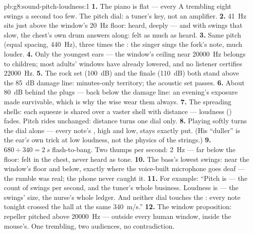 \begin{solution}{pb:g8:sound-pitch-loudness:1}
\textbf{1.} The piano is flat --- every A trembling eight
swings a second too few. The pitch dial: a tuner's key, not
an amplifier.
\textbf{2.} \qty{41}{Hz} sits just above the window's
\qty{20}{Hz} floor: heard, deeply --- and with swings that
slow, the chest's own drum answers along: felt as much as
heard.
\textbf{3.} Same pitch (equal spacing, \qty{440}{Hz}),
three times the : the singer sings the fork's note,
much louder.
\textbf{4.} Only the youngest ears --- the window's ceiling
near \qty{20000}{Hz} belongs to children; most adults'
windows have already lowered, and no listener certifies
\qty{22000}{Hz}.
\textbf{5.} The rock set (\qty{100}{dB}) and the finale
(\qty{110}{dB}) both stand above the \qty{85}{dB} damage
line: minutes-only territory; the acoustic set passes.
\textbf{6.} About \qty{80}{dB} behind the plugs --- back
below the damage line: an evening's exposure made
survivable, which is why the wise wear them always.
\textbf{7.} The spreading shells: each squeeze is shared
over a vaster shell with distance --- loudness ()
fades. Pitch rides unchanged: distance turns one dial only.
\textbf{8.} Playing softly turns the  dial alone
--- every note's , high and low, stays exactly
put. (His ``duller'' is the ear's own trick at low
loudness, not the physics of the strings.)
\textbf{9.} $680 \div 340 = \qty{2}{s}$ flash-to-bang. Two
thumps per second: \qty{2}{Hz} --- far below the floor:
felt in the chest, never heard as tone.
\textbf{10.} The bass's lowest swings: near the window's
floor and below, exactly where the voice-built microphone
goes deaf --- the rumble was real; the phone never caught
it.
\textbf{11.} For example: ``Pitch is  --- the count
of swings per second, and the tuner's whole business.
Loudness is  --- the swings' size, the nurse's
whole ledger. And neither dial touches the : every
note tonight crossed the hall at the same \qty{340}{m/s}.''
\textbf{12.} The window proposition: repeller pitched above
\qty{20000}{Hz} --- outside every human window, inside the
mouse's. One trembling, two audiences, no contradiction.
\end{solution}
